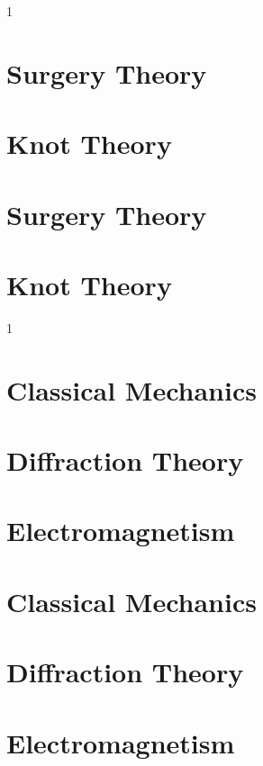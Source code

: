 \documentclass{book}                                                           %
\newcommand*{\TOPPATH}{books}
\newcommand*{\PATH}{\TOPPATH/}
\newcounter{endpage}
\def\compilegeotop{0}
\def\compilephysics{0}
\begin{document}
    \if\compilegeotop1
        \part{Surgery Theory}
            
        \part{Knot Theory}
            
    \else
        \part{Surgery Theory}
        \part{Knot Theory}
    \fi
    \clearpage

    \setcounter{endpage}{\thepage}
    \label{book:Physics}
    \renewcommand{\PATH}{\TOPPATH/Physics}
    \setcounter{page}{\value{endpage}}

    \if\compilephysics1
        \part{Classical Mechanics}
            
        \part{Diffraction Theory}
            
            
            
        \part{Electromagnetism}
           
    \else
        \part{Classical Mechanics}
        \part{Diffraction Theory}
        \part{Electromagnetism}
    \fi
    \clearpage

    \printnoidxglossary[type=\acronymtype]
    \clearpage
    \printnoidxglossary[type=notation, style=mcolindex, sort=def]
    \clearpage
    \printnoidxglossary[style=longpara]

    \clearpage
    \nocite{*}
    
    

    \clearpage
    \printindex
\end{document}
